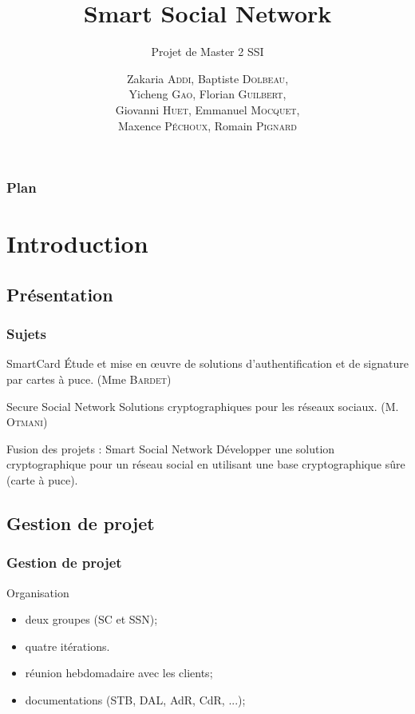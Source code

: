 \documentclass{beamer}
\title{Smart Social Network}
\subtitle{Projet de Master 2 SSI}
\author{
    Zakaria \textsc{Addi},
    Baptiste \textsc{Dolbeau},\\
    Yicheng \textsc{Gao},
    Florian \textsc{Guilbert},\\
    Giovanni \textsc{Huet},
    Emmanuel \textsc{Mocquet},\\
    Maxence \textsc{Péchoux},
    Romain \textsc{Pignard}
}
\institute{Université de Rouen}
\begin{document}
\begin{frame}
    \titlepage 
\end{frame}

\begin{frame}
    \frametitle{Plan}
    \tableofcontents[hideallsubsections]
\end{frame}

\section{Introduction}

\subsection{Présentation}
\begin{frame}
    \frametitle{Sujets}
    \begin{block}{SmartCard}
       Étude et mise en \oe{}uvre de solutions d’authentification et de signature 
       par cartes à puce. (Mme \textsc{Bardet})
    \end{block}
    \begin{block}{Secure Social Network}
       Solutions cryptographiques pour les réseaux sociaux. (M. \textsc{Otmani})
    \end{block}
    \pause
    \begin{block}{Fusion des projets : Smart Social Network}
       Développer une solution cryptographique pour un réseau social en 
      utilisant une base cryptographique sûre (carte à puce). 
    \end{block}
\end{frame}

\subsection{Gestion de projet}
\begin{frame}
    \frametitle{Gestion de projet}
    \begin{block}{Organisation}
        \begin{itemize}
            \item deux groupes (SC et SSN);
            \item quatre itérations.
            \item réunion hebdomadaire avec les clients;
            \item documentations (STB, DAL, AdR, CdR, ...);
        \end{itemize}
    \end{block}
\end{frame}
\end{document}
